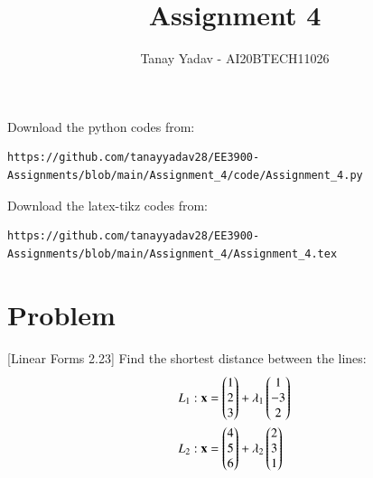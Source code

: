 \documentclass[journal,12pt,twocolumn]{IEEEtran}
\begin{document}
\let\vec\mathbf
\renewcommand{\thefigure}{\theproblem}
\def\putbox#1#2#3{\makebox[0in][l]{\makebox[#1][l]{}\raisebox{\baselineskip}[0in][0in]{\raisebox{#2}[0in][0in]{#3}}}}
     \def\rightbox#1{\makebox[0in][r]{#1}}
     \def\centbox#1{\makebox[0in]{#1}}
     \def\topbox#1{\raisebox{-\baselineskip}[0in][0in]{#1}}
     \def\midbox#1{\raisebox{-0.5\baselineskip}[0in][0in]{#1}}
\vspace{3cm}
\title{Assignment 4}
\author{Tanay Yadav - AI20BTECH11026}
\maketitle
\newpage
\bigskip
\renewcommand{\thefigure}{\theenumi}
\renewcommand{\thetable}{\theenumi}
Download the python codes from: 
%
\begin{lstlisting}
https://github.com/tanayyadav28/EE3900-Assignments/blob/main/Assignment_4/code/Assignment_4.py
\end{lstlisting}
Download the latex-tikz codes from: 
%
\begin{lstlisting}
https://github.com/tanayyadav28/EE3900-Assignments/blob/main/Assignment_4/Assignment_4.tex
\end{lstlisting}
\section{Problem}
[Linear Forms 2.23]
Find the shortest distance between the lines:
\begin{align}
    L_1 : \vec{x} &= \myvec{1\\2\\3} + \lambda_1 \myvec{1\\-3\\2} \label{eq:1}\\
    L_2 : \vec{x} &= \myvec{4\\5\\6} + \lambda_2 \myvec{2\\3\\1} \label{eq:2}
\end{align}
\end{document}
